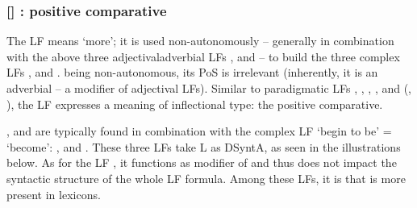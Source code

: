 \subsubsection*{{\small []}  : positive comparative}\label{lf:Plus}

The  LF means `more'; it is used non-autonomously -- generally in combination with the above three adjectival\slashs{}adverbial LFs ,  and  -- to build the three complex LFs ,  and .  being non-autonomous, its PoS is irrelevant (inherently, it is an adverbial -- a modifier of adjectival LFs). Similar to paradigmatic LFs , , , ,  and  (, ), the LF  expresses a meaning of inflectional type: the positive comparative.

,  and  are typically found in combination with the complex LF  `begin to be' = `become': \label{lf:IncepPredPlusMagn}, \label{lf:IncepPredPlusVer} and \label{lf:IncepPredPlusBon}. These three LFs take L as DSyntA\thinspace{}, as seen in the illustrations below. As for the LF , it functions as modifier of  \slashs{}\slashs{} and thus does not impact the syntactic structure of the whole LF formula. Among these LFs, it is  that is more present in lexicons.

